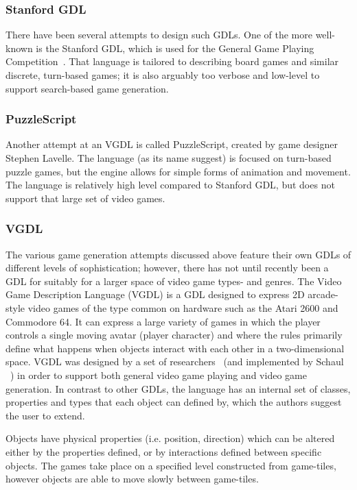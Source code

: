 \documentclass[a4paper,titlepage,final, twoside]{report}
\begin{document}
\subsubsection*{Stanford GDL}
There have been several attempts to design such GDLs. One of the more well-known is the Stanford GDL, which is used for the General Game Playing Competition~\citet{genesereth2005general}. That language is tailored to describing board games and similar discrete, turn-based games; it is also arguably too verbose and low-level to support search-based game generation. 

\subsubsection*{PuzzleScript}
Another attempt at an VGDL is called PuzzleScript, created by game designer Stephen Lavelle. The language (as its name suggest) is focused on turn-based puzzle games, but the engine allows for simple forms of animation and movement. The language is relatively high level compared to Stanford GDL, but does not support that large set of video games.


\subsubsection*{VGDL}
The various game generation attempts discussed above feature their own GDLs of different levels of sophistication; however, there has not until recently been a GDL for suitably for a larger space of video game types- and genres.
The Video Game Description Language (VGDL) is a GDL designed to express 2D arcade-style video games of the type common on hardware such as the Atari 2600 and Commodore 64. It can express a large variety of games in which the player controls a single moving avatar (player character) and where the rules primarily define what happens when objects interact with each other in a two-dimensional space. VGDL was designed by a set of researchers~\citet{levine2013general,ebner2013towards} (and implemented by Schaul ~\citet{schaul2013video}) in order to support both general video game playing and video game generation.
In contrast to other GDLs, the language has an internal set of classes, properties and types that each object can defined by, which the authors suggest the user to extend.

Objects have physical properties (i.e. position, direction) which can be altered either by the properties defined, or by interactions defined between specific objects. 
The games take place on a specified level constructed from game-tiles, however objects are able to move slowly between game-tiles.
\end{document}
